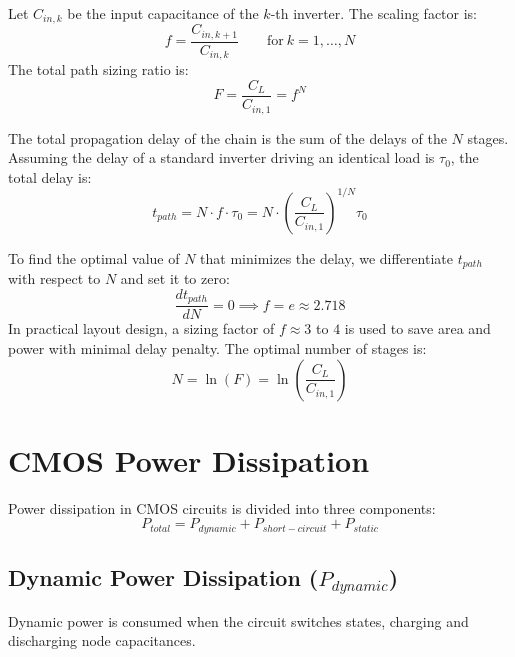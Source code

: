 \documentclass[12pt,a4paper]{article}
\begin{document}
\begin{tcolorbox}[defbox, title={\textbf{Inverter Chain Sizing Model}}]
Let $C_{in, k}$ be the input capacitance of the $k$-th inverter. The scaling factor is:
\begin{equation}
  f = \frac{C_{in, k+1}}{C_{in, k}} \qquad \text{for} \ k = 1, \dots, N
\end{equation}
The total path sizing ratio is:
\begin{equation}
  F = \frac{C_L}{C_{in, 1}} = f^N
\end{equation}
\end{tcolorbox}

The total propagation delay of the chain is the sum of the delays of the $N$ stages. Assuming the delay of a standard inverter driving an identical load is $\tau_0$, the total delay is:
\begin{equation}
  t_{path} = N \cdot f \cdot \tau_0 = N \cdot \left(\frac{C_L}{C_{in, 1}}\right)^{1/N} \tau_0
\end{equation}

To find the optimal value of $N$ that minimizes the delay, we differentiate $t_{path}$ with respect to $N$ and set it to zero:
\begin{equation}
  \frac{d t_{path}}{d N} = 0 \implies f = e \approx 2.718
\end{equation}
In practical layout design, a sizing factor of $f \approx 3$ to $4$ is used to save area and power with minimal delay penalty. The optimal number of stages is:
\begin{equation}
  N = \ln(F) = \ln\left( \frac{C_L}{C_{in, 1}} \right)
\end{equation}

\section{CMOS Power Dissipation}

Power dissipation in CMOS circuits is divided into three components:
\begin{equation}
  P_{total} = P_{dynamic} + P_{short-circuit} + P_{static}
\end{equation}

\subsection{Dynamic Power Dissipation (\texorpdfstring{$P_{dynamic}$}{P\_dynamic})}
Dynamic power is consumed when the circuit switches states, charging and discharging node capacitances.
\end{document}
